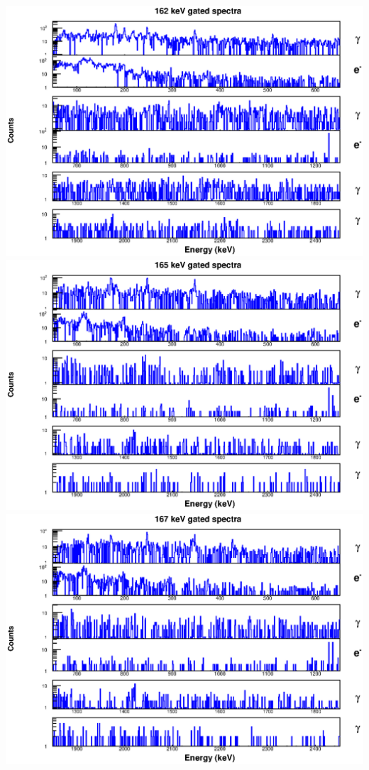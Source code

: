 \includegraphics[scale=0.8]{154Gd_Appendix/162_combined.eps}
\includegraphics[scale=0.8]{154Gd_Appendix/165_combined.eps}
\includegraphics[scale=0.8]{154Gd_Appendix/167_combined.eps}
